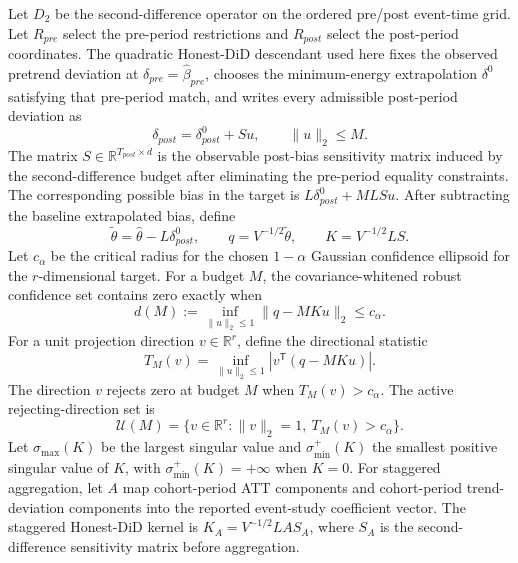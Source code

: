 \documentclass[11pt]{article}
\newcommand{\transpose}{\mathsf{T}}
\newcommand{\R}{\mathbb{R}}
\theoremstyle{definition}
\theoremstyle{plain}
\theoremstyle{remark}
\begin{document}
Let \(D_2\) be the second-difference operator on the ordered pre/post event-time grid.
Let \(R_{pre}\) select the pre-period restrictions and \(R_{post}\) select the post-period coordinates.
The quadratic Honest-DiD descendant used here fixes the observed pretrend deviation at \(\delta_{pre}=\widehat\beta_{pre}\), chooses the minimum-energy extrapolation \(\delta^0\) satisfying that pre-period match, and writes every admissible post-period deviation as
\[
  \delta_{post}=\delta^0_{post}+S u,\qquad \|u\|_2\le M.
\]
The matrix \(S\in\R^{T_{post}\times d}\) is the observable post-bias sensitivity matrix induced by the second-difference budget after eliminating the pre-period equality constraints.
The corresponding possible bias in the target is \(L\delta^0_{post}+M L S u\).
After subtracting the baseline extrapolated bias, define
\[
  \widetilde\theta=\widehat\theta-L\delta^0_{post},\qquad
  q=V^{-1/2}\widetilde\theta,\qquad
  K=V^{-1/2}L S.
\]
Let \(c_\alpha\) be the critical radius for the chosen \(1-\alpha\) Gaussian confidence ellipsoid for the \(r\)-dimensional target.
For a budget \(M\), the covariance-whitened robust confidence set contains zero exactly when
\[
  d(M):=\inf_{\|u\|_2\le1}\|q-MKu\|_2\le c_\alpha.
\]
For a unit projection direction \(v\in\R^r\), define the directional statistic
\[
  T_M(v)=\inf_{\|u\|_2\le1}|v^\transpose(q-MKu)|.
\]
The direction \(v\) rejects zero at budget \(M\) when \(T_M(v)>c_\alpha\).
The active rejecting-direction set is
\[
  \mathcal U(M)=\{v\in\R^r:\|v\|_2=1,\ T_M(v)>c_\alpha\}.
\]
Let \(\sigma_{\max}(K)\) be the largest singular value and \(\sigma_{\min}^+(K)\) the smallest positive singular value of \(K\), with \(\sigma_{\min}^+(K)=+\infty\) when \(K=0\).
For staggered aggregation, let \(A\) map cohort-period ATT components and cohort-period trend-deviation components into the reported event-study coefficient vector.
The staggered Honest-DiD kernel is \(K_A=V^{-1/2}L A S_A\), where \(S_A\) is the second-difference sensitivity matrix before aggregation.
\end{document}
